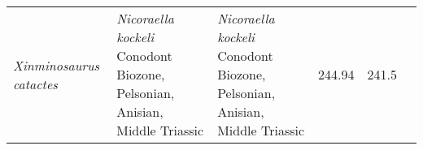 \begin{longtabu}{>{\itshape}lXXSSl}
	Xinminosaurus catactes                               & \emph{Nicoraella
        kockeli} Conodont Biozone, Pelsonian, Anisian, Middle Triassic
                                                             & \emph{Nicoraella
        kockeli} Conodont Biozone, Pelsonian, Anisian, Middle Triassic
                                                             & 244.94
                                                             & 241.5
                                                             &
                                                             \cite{Jiang2008PNS} \\                     
\end{longtabu}                                        

% 
